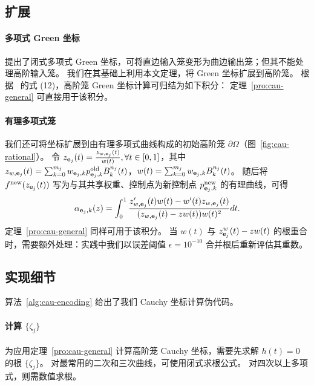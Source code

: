 \subsection{扩展}\label{sec:cau-connection}
\paragraph{多项式 Green 坐标}
\citet{MichelThiery2023} 提出了闭式多项式 Green 坐标，可将直边输入笼变形为曲边输出笼；但其不能处理高阶输入笼。
我们在其基础上利用本文定理，将 Green 坐标扩展到高阶笼。
根据~\cite{MichelThiery2023} 的式 (12)，高阶笼 Green 坐标计算可归结为如下积分：
定理~\ref{pro:cau-general} 可直接用于该积分。

\paragraph{有理多项式笼}
我们还可将坐标扩展到由有理多项式曲线构成的初始高阶笼 $\partial \Omega$（图~\ref{fig:cau-rational}）。
令 $z_{\mathbf{e}_j}(t) = \frac{z_{w,\mathbf{e}_j}(t)}{w(t)}, \forall t \in [0, 1]$，其中 \(z_{w,\mathbf{e}_j}(t)=\sum_{k=0}^{m_j}w_{\mathbf{e}_j,k}p_{\mathbf{e}_j,k}^{\text{old}}B_k^{n_j}(t)\)，\(w(t)=\sum_{k=0}^{m_j}w_{\mathbf{e}_j,k}B_k^{n_j}(t)\)。
随后将 $f^\text{new}(z_{\mathbf{e}_j}(t))$ 写为与其共享权重、控制点为新控制点 \(p^\text{new}_{\mathbf{e}_j,k}\) 的有理曲线，可得
\begin{equation}
    \alpha_{\mathbf{e}_j,k}(z)=\int_0^1 \frac{z_{w,\mathbf{e}_j}'(t)w(t)-w'(t)z_{w,\mathbf{e}_j}(t)}{(z_{w,\mathbf{e}_j}(t)-zw(t))w(t)^2}dt.
\end{equation}
定理~\ref{pro:cau-general} 同样可用于该积分。
当 \(w(t)\) 与 \(z_{\mathbf{e}_j}^{w}(t)-zw(t)\) 的根重合时，需要额外处理：实践中我们以误差阈值 \(\epsilon=10^{-10}\) 合并根后重新评估其重数。

\subsection{实现细节}\label{sec:cau-details}
算法~\ref{alg:cau-encoding} 给出了我们 Cauchy 坐标计算伪代码。

\paragraph{计算 \(\{\zeta_j\}\)}
为应用定理~\ref{pro:cau-general} 计算高阶笼 Cauchy 坐标，需要先求解 $h(t)=0$ 的根 $\{\zeta_j\}$。
对最常用的二次和三次曲线，可使用闭式求根公式。
对四次以上多项式，则需数值求根。

